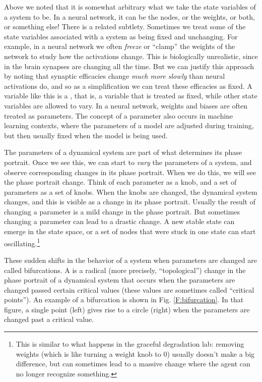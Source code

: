Above we noted that it is somewhat arbitrary what we take the state variables of a system to be. In a neural network, it can be the nodes, or the weights, or both, or something else! There is a related subtlety. Sometimes we treat some of the state variables associated with a system as being fixed and unchanging. For example, in a neural network we often \emph{freeze} or ``clamp'' the weights of the network to study how the activations change. This is biologically unrealistic, since in the brain synapses are changing all the time. But we can justify this approach by noting that synaptic efficacies change \emph{much more slowly} than neural activations do, and so as a simplification we can treat these efficacies as fixed. A variable like this is a , that is, a variable that is treated as fixed, while other state variables are allowed to vary. In a neural network, weights and biases are often treated as parameters. The concept of a parameter also occurs in machine learning contexts, where the parameters of a model are adjusted during training, but then usually fixed when the model is being used.

The parameters of a dynamical system are part of what determines its phase portrait. Once we see this, we can start to \emph{vary} the parameters of a system, and observe corresponding changes in its phase portrait. When we do this, we will see the phase portrait change. Think of each parameter as a knob, and a set of parameters as a set of knobs. When the knobs are changed, the dynamical system changes, and this is visible as a change in its phase portrait. Usually the result of changing a parameter is a mild change in the phase portrait. But sometimes changing a parameter can lead to a drastic change. A new stable state can emerge in the state space, or a set of nodes that were stuck in one state can start oscillating.\footnote{This is similar to what happens in the graceful degradation lab: removing weights (which is like turning a weight knob to 0) usually doesn't make a big difference, but can sometimes lead to a massive change where the agent can no longer recognize something.} 

These sudden shifts in the behavior of a system when parameters are changed are called bifurcations. A  is a radical (more precisely, ``topological'') change in the phase portrait of a dynamical system that occurs when the parameters are changed passed certain critical values (these values are sometimes called ``critical points''). An example of a bifurcation is shown in Fig. \ref{F:bifurcation}. In that figure, a single point (left) gives rise to a circle (right) when the parameters are changed past a critical value.

